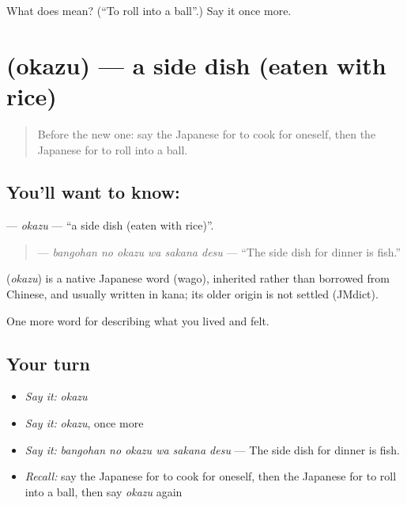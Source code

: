\begin{tcolorbox}[breakable,colback=teal!4,colframe=teal!35!black,title={Before you move on}]
What does  mean? (\textquotedblleft{}To roll into a ball\textquotedblright{}.) Say it once more.
\end{tcolorbox}
\section[\texorpdfstring{\ja{おかず} (okazu)}{おかず (okazu)}]{ (okazu) — a side dish (eaten with rice)}

\label{lesson:JA-C497-okazu}



\begin{quote}
Before the new one: say the Japanese for to cook for oneself, then the Japanese for to roll into a ball.
\end{quote}

\subsection*{You'll want to know: }
\textbf{} — \emph{okazu} — \textquotedblleft{}a side dish (eaten with rice)\textquotedblright{}.

\begin{quote}
\textbf{  } — \emph{bangohan no okazu wa sakana desu} — \textquotedblleft{}The side dish for dinner is fish.\textquotedblright{}
\end{quote}

\begin{cousinweb}
\textbf{} (\emph{okazu}) is a native Japanese word (wago), inherited rather than borrowed from Chinese, and usually written in kana; its older origin is not settled (JMdict).
\end{cousinweb}

\begin{grammarlens}[title={What you've built}]
One more word for describing what you lived and felt.
\end{grammarlens}

\subsection*{Your turn}
\begin{itemize}
\raggedright
  \item \emph{Say it:} \emph{okazu}
  \item \emph{Say it:} \emph{okazu}, once more
  \item \emph{Say it:} \emph{bangohan no okazu wa sakana desu} — The side dish for dinner is fish.
  \item \emph{Recall:} say the Japanese for to cook for oneself, then the Japanese for to roll into a ball, then say \emph{okazu} again
\end{itemize}

